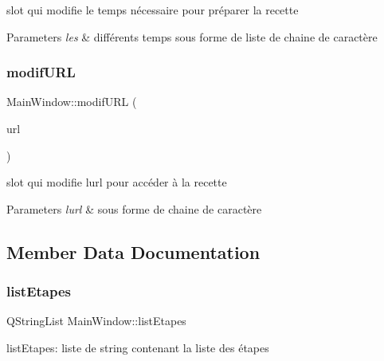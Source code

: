 slot qui modifie le temps nécessaire pour préparer la recette 


\begin{DoxyParams}{Parameters}
{\em les} & différents temps sous forme de liste de chaine de caractère \\
\hline
\end{DoxyParams}
\mbox{\label{classMainWindow_a3620273f0e53b380d70df636400e8519}} 
\subsubsection{\texorpdfstring{modif\+U\+RL}{modifURL}}
{\footnotesize\ttfamily Main\+Window\+::modif\+U\+RL (\begin{DoxyParamCaption}\item[{Q\+String}]{url }\end{DoxyParamCaption})\hspace{0.3cm}{\ttfamily [slot]}}



slot qui modifie l\textquotesingle{}url pour accéder à la recette 


\begin{DoxyParams}{Parameters}
{\em l\textquotesingle{}url} & sous forme de chaine de caractère \\
\hline
\end{DoxyParams}


\subsection{Member Data Documentation}
\mbox{\label{classMainWindow_a1290f4c9df65fb27c870753aa2b24a88}} 
\subsubsection{\texorpdfstring{list\+Etapes}{listEtapes}}
{\footnotesize\ttfamily Q\+String\+List Main\+Window\+::list\+Etapes\hspace{0.3cm}{\ttfamily [private]}}

list\+Etapes\+: liste de string contenant la liste des étapes \mbox{\label{classMainWindow_af5f0afb6c5f81e4438f98f93f918ea8b}} 
